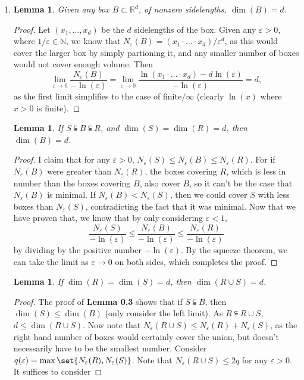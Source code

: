 \documentclass[12pt]{article}
\def\mbb#1{\mathbb{#1}}
\def\bN{\mbb{N}}
\newtheorem{lemma}[theorem]{Lemma}
\theoremstyle{definition}
\theoremstyle{remark}
\newcommand{\R}{\mathbb{R}}
\newcommand{\ve}{\varepsilon}
\begin{document}
\begin{enumerate}[leftmargin=\labelsep]
		\item
		\begin{lemma}
			Given any box $B \subset \R^d$, of nonzero sidelengths, $\dim(B) = d$.
		\end{lemma}
		\begin{proof}
			Let $(x_1, \ldots, x_d)$ be the $d$ sidelengths of the box. Given any $\ve > 0$, where $1/\ve \in \bN$, we know that $N_{\ve}(B) = (x_1 \cdot \hdots \cdot x_d)/\ve^d$, as this would cover the larger box by simply partioning it, and any smaller number of boxes would not cover enough volume. Then 
			\[ \lim_{\ve \to 0} \frac{N_\ve(B)}{-\ln(\ve)} = \lim_{\ve \to 0} \frac{\ln(x_1\cdot \hdots \cdot x_d) - d\ln(\ve)}{-\ln(\ve)} = d,
			 \] as the first limit simplifies to the case of finite$/\infty$ (clearly $\ln(x)$ where $x > 0$ is finite).
		 	\end{proof}
	 	\begin{lemma}
	 		If $S \subseteqq B \subseteqq R$, and $\dim(S)=\dim(R)=d$, then $\dim(B) = d$.
 			 	\end{lemma}
		\begin{proof}
			I claim that for any $\ve > 0$, $N_\ve(S) \leq N_\ve(B) \leq N_\ve(R)$. For if $N_\ve(B)$ were greater than $N_\ve(R)$, the boxes covering $R$, which is less in number than the boxes covering $B$, also cover $B$, so it can't be the case that $N_\ve(B)$ is minimal. If $N_\ve(B) < N_\ve(S)$, then we could cover $S$ with less boxes than $N_\ve(S)$, contradicting the fact that it was minimal. Now that we have proven that, we know that by only considering $\ve < 1$, 
			\[  \frac{N_\ve(S)}{-\ln(\ve)} \leq  \frac{N_\ve(B)}{-\ln(\ve)} \leq  \frac{N_\ve(R)}{-\ln(\ve)} \]
			by dividing by the positive number $-\ln(\ve)$. By the squeeze theorem, we can take the limit as $\ve \to 0$ on both sides, which completes the proof.
		\end{proof}
		\begin{lemma}
			If $\dim(R)=\dim(S)=d$, then $\dim(R \cup S)=d$.
		\end{lemma}
		\begin{proof}
			The proof of \textbf{Lemma 0.3} shows that if $S \subseteqq B$, then $\dim(S) \leq \dim(B)$ (only consider the left limit). As $R \subseteqq R \cup S$, $d \leq \dim(R \cup S)$. Now note that $N_\ve(R \cup S) \leq N_\ve(R) + N_\ve(S)$, as the right hand number of boxes would certainly cover the union, but doesn't necessarily have to be the smallest number. Consider $q(\ve) = \max \set{N_\ve(R),N_\ve(S)}$. Note that $N_\ve(R \cup S) \leq 2q$ for any $\ve > 0$. It suffices to consider

\end{proof}
\end{enumerate}
\end{document}
